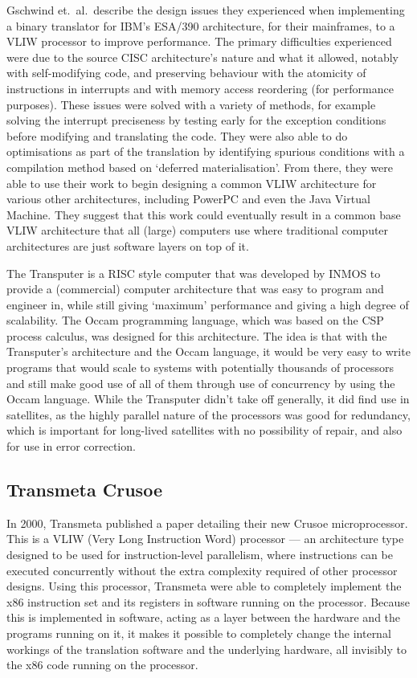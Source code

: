Gschwind et.\ al.\ describe the design issues they experienced when implementing
a binary translator for IBM's ESA/390 architecture, for their mainframes, to a
VLIW processor to improve performance. The primary difficulties experienced were
due to the source CISC architecture's nature and what it allowed, notably with
self-modifying code, and preserving behaviour with the atomicity of instructions
in interrupts and with memory access reordering (for performance purposes).
These issues were solved with a variety of methods, for example solving the
interrupt preciseness by testing early for the exception conditions before
modifying and translating the code. They were also able to do optimisations as
part of the translation by identifying spurious conditions with a compilation
method based on `deferred materialisation'. From there, they were able to use
their work to begin designing a common VLIW architecture for various other
architectures, including PowerPC and even the Java Virtual Machine. They suggest
that this work could eventually result in a common base VLIW architecture that
all (large) computers use where traditional computer architectures are just
software layers on top of it.\cite{Gschwind2000BinaryTranslation}

The Transputer is a RISC style computer that was developed by INMOS to provide a
(commercial) computer architecture that was easy to program and engineer in,
while still giving `maximum' performance and giving a high degree of
scalability. The Occam programming language, which was based on the CSP process
calculus, was designed for this architecture.  The idea is that with the
Transputer's architecture and the Occam language, it would be very easy to write
programs that would scale to systems with potentially thousands of processors
and still make good use of all of them through use of concurrency by using the
Occam language.\cite{Whitby1985Transputer} While the Transputer didn't take off
generally, it did find use in satellites, as the highly parallel nature of the
processors was good for redundancy, which is important for long-lived satellites
with no possibility of repair, and also for use in error
correction.\cite{Mattos1990Transputer}

\subsection{Transmeta Crusoe}
In 2000, Transmeta published a paper detailing their new Crusoe microprocessor.
This is a VLIW (Very Long Instruction Word) processor --- an architecture type
designed to be used for instruction-level parallelism, where instructions can be
executed concurrently without the extra complexity required of other processor
designs. Using this processor, Transmeta were able to completely implement the
x86 instruction set and its registers in software running on the processor.
Because this is implemented in software, acting as a layer between the hardware
and the programs running on it, it makes it possible to completely change the
internal workings of the translation software and the underlying hardware, all
invisibly to the x86 code running on the processor.

